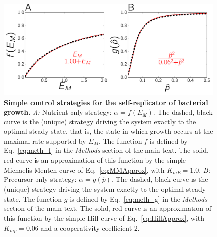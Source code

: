 \begin{figure}[h]
\centering
\includegraphics[width=\textwidth]{./Fig/plot_strategies}
\caption{
\textbf{Simple control strategies for the self-rep\-li\-cat\-or of bacterial growth.}
\textit{A:} Nutrient-only strategy: $\alpha = f(E_M)$.
The dashed, black curve is the (unique) strategy driving the system exactly to the optimal steady state, that is, the state in which growth occurs at the maximal rate supported by $E_M$.
The function $f$ is defined by Eq.~\ref{eq:meth_f} in the \textit{Methods} section of the main text.
The solid, red curve is an approximation of this function by the simple Michaelis-Menten curve of Eq.~\ref{eq:MMApprox}, with $K_{mE} = 1.0$.
\textit{B:} Precursor-only strategy: $\alpha = g(\hat{p})$.
The dashed, black curve is the (unique) strategy driving the system exactly to the optimal steady state.
The function $g$ is defined by Eq.~\ref{eq:meth_g} in the \textit{Methods} section of the main text.
The solid, red curve is an approximation of this function by the simple Hill curve of Eq.~\ref{eq:HillApprox}, with $K_{mp} = 0.06$ and a cooperativity coefficient 2.}
\end{figure}